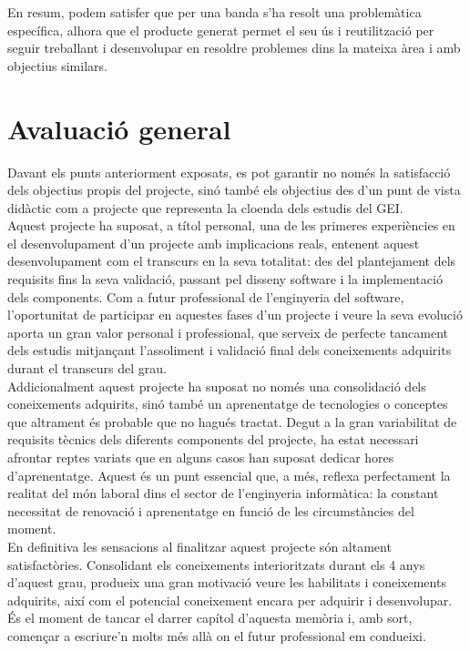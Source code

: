 En resum, podem satisfer que per una banda s'ha resolt una problemàtica específica, alhora que el producte generat permet el seu ús i reutilització per seguir treballant i desenvolupar en resoldre problemes dins la mateixa àrea i amb objectius similars.

\section{Avaluació general}

Davant els punts anteriorment exposats, es pot garantir no només la satisfacció dels objectius propis del projecte, sinó també els objectius des d'un punt de vista didàctic com a projecte que representa la cloenda dels estudis del GEI.\\

Aquest projecte ha suposat, a títol personal, una de les primeres experiències en el desenvolupament d'un projecte amb implicacions reals, entenent aquest desenvolupament com el transcurs en la seva totalitat: des del plantejament dels requisits fins la seva validació, passant pel disseny software i la implementació dels components. Com a futur professional de l'enginyeria del software, l'oportunitat de participar en aquestes fases d'un projecte i veure la seva evolució aporta un gran valor personal i professional, que serveix de perfecte tancament dels estudis mitjançant l'assoliment i validació final dels coneixements adquirits durant el transcurs del grau.\\

Addicionalment aquest projecte ha suposat no només una consolidació dels coneixements adquirits, sinó també un aprenentatge de tecnologies o conceptes que altrament és probable que no hagués tractat. Degut a la gran variabilitat de requisits tècnics dels diferents components del projecte, ha estat necessari afrontar reptes variats que en alguns casos han suposat dedicar hores d'aprenentatge. Aquest és un punt essencial que, a més, reflexa perfectament la realitat del món laboral dins el sector de l'enginyeria informàtica: la constant necessitat de renovació i aprenentatge en funció de les circumstàncies del moment.\\

En definitiva les sensacions al finalitzar aquest projecte són altament satisfactòries. Consolidant els coneixements interioritzats durant els 4 anys d'aquest grau, produeix una gran motivació veure les habilitats i coneixements adquirits, així com el potencial coneixement encara per adquirir i desenvolupar. És el moment de tancar el darrer capítol d'aquesta memòria i, amb sort, començar a escriure'n molts més allà on el futur professional em condueixi. \\